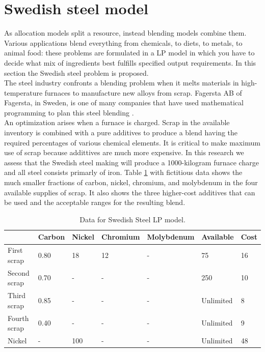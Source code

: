 \documentclass[a4paper,10 pt,titlepage,twoside]{book}
\theoremstyle{plain}
\theoremstyle{definition}
\theoremstyle{remark}
\begin{document}
{{\section{Swedish steel model}
As allocation models split a resource, instead blending models combine them. Various applications blend everything from chemicals, to diets, to metals, to animal food: these problems are formulated in a LP model in which you have to decide what mix of ingredients best fulfills specified output requirements. In this section the Swedish steel problem is proposed.\\
The steel industry confronts a blending problem when it melts materials in high-temperature furnaces to manufacture new alloys from scrap. Fagersta AB of Fagersta, in Sweden, is one of many companies that have used mathematical programming to plan this steel blending \cite{SSM}.\\
An optimization arises when a furnace is charged. Scrap in the available inventory is combined with a pure additives to produce a blend having the required percentages of various chemical elements. It is critical to make maximum use of scrap because addittives are much more expensive. In this research we assess that the Swedish steel making will produce a 1000-kilogram furnace charge and all steel consists primarly of iron. Table \ref{table:carbon} with fictitious data shows the much smaller fractions of carbon, nickel, chromium, and molybdenum in the four available supplies of scrap. It also shows the three higher-cost additives that can be used and the acceptable ranges for the resulting blend.\\
\begin{table}[h]\caption{\label{table:carbon}Data for Swedish Steel LP model.}
\begin{center}
	\begin{tabular}{@{}lllllll@{}}
		\toprule
		& Carbon & Nickel & Chromium & Molybdenum & Available & Cost \\ \midrule
		First scrap   & 0.80   & 18     & 12       & -          & 75        & 16   \\
		Second scrap  & 0.70   & -      & -        & -          & 250       & 10   \\
		Third scrap   & 0.85   & -      & -        & -          & Unlimited & 8    \\
		Fourth scrap  & 0.40   & -      & -        & -          & Unlimited & 9    \\
		Nickel        & -      & 100    & -        & -          & Unlimited & 48   \\

\end{tabular}
\end{center}
\end{table}}}
\end{document}
